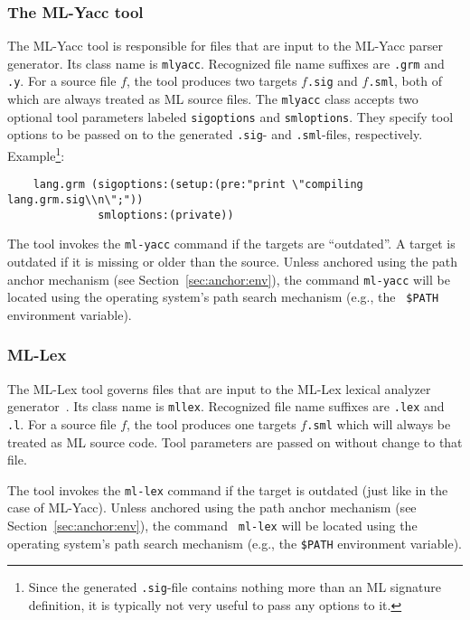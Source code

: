 \documentclass[titlepage,letterpaper]{article}
\begin{document}
\subsubsection*{The ML-Yacc tool}

The ML-Yacc tool is responsible for files that are input to the
ML-Yacc parser generator.  Its class name is {\tt mlyacc}.  Recognized
file name suffixes are {\tt .grm} and {\tt .y}.  For a source file
$f$, the tool produces two targets $f${\tt .sig} and $f${\tt .sml},
both of which are always treated as ML source files.  The {\tt mlyacc}
class accepts two optional tool parameters labeled {\tt sigoptions}
and {\tt smloptions}.  They specify tool options to be passed on to
the generated {\tt .sig}- and {\tt .sml}-files, respectively.
Example\footnote{Since the generated {\tt .sig}-file contains nothing
more than an ML signature definition, it is typically not very useful
to pass any options to it.}:

\begin{verbatim}
    lang.grm (sigoptions:(setup:(pre:"print \"compiling lang.grm.sig\\n\";"))
              smloptions:(private))
\end{verbatim}

The tool invokes the {\tt ml-yacc} command if the targets are
``outdated''.  A target is outdated if it is missing or older than the
source.  Unless anchored using the path anchor mechanism (see
Section~\ref{sec:anchor:env}), the command {\tt ml-yacc} will be located
using the operating system's path search mechanism (e.g., the {\tt
\$PATH} environment variable).

\subsubsection*{ML-Lex}

The ML-Lex tool governs files that are input to the ML-Lex lexical
analyzer generator~\cite{appel89:lex}.  Its class name is {\tt mllex}.
Recognized file name suffixes are {\tt .lex} and {\tt .l}.  For a
source file $f$, the tool produces one targets $f${\tt .sml} which
will always be treated as ML source code.  Tool parameters are passed
on without change to that file.

The tool invokes the {\tt ml-lex} command if the target is outdated
(just like in the case of ML-Yacc).  Unless anchored using the path
anchor mechanism (see Section~\ref{sec:anchor:env}), the command {\tt
ml-lex} will be located using the operating system's path search
mechanism (e.g., the {\tt \$PATH} environment variable).
\end{document}
